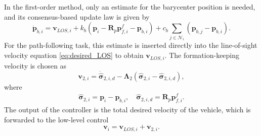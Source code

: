  In the first-order method, only an estimate for the barycenter position is needed, and its consensus-based update law is given by
\begin{equation}
    \dot{\mathbf{p}}_{b,i} = \mathbf{v}_{LOS,i} + k_{b}(\mathbf{p}_i-\mathbf{R}_p\mathbf{p}_{f,i}^f - \mathbf{p}_{b,i}) +  c_{b}\sum_{j\in\mathcal{N}_i}(\mathbf{p}_{b,j}-\mathbf{p}_{b,i}).
\end{equation}
For the path-following task, this estimate is inserted directly into the line-of-sight velocity equation \eqref{eq:desired_LOS} to obtain $\mathbf{v}_{LOS,i}$. The formation-keeping velocity is chosen as
\begin{equation}
     \mathbf{v}_{2,i} = \dot{\widehat{\bm{\sigma}}}_{2,i,d} -\bm{\Lambda}_{2}(\widehat{\bm{\sigma}}_{2,i} - \widehat{\bm{\sigma}}_{2,i,d}),
\end{equation}
where
\begin{align}
    \widehat{\bm{\sigma}}_{2,i} = \mathbf{p}_i - \mathbf{p}_{b,i}, \quad \widehat{\bm{\sigma}}_{2,i,d} = \mathbf{R}_p \mathbf{p}_{f,i}^f.
\end{align}
The output of the controller is the total desired velocity of the vehicle, which is forwarded to the low-level control
\begin{equation}
    \mathbf{v}_i = \mathbf{v}_{LOS,i} + \mathbf{v}_{2,i}.
\end{equation}

